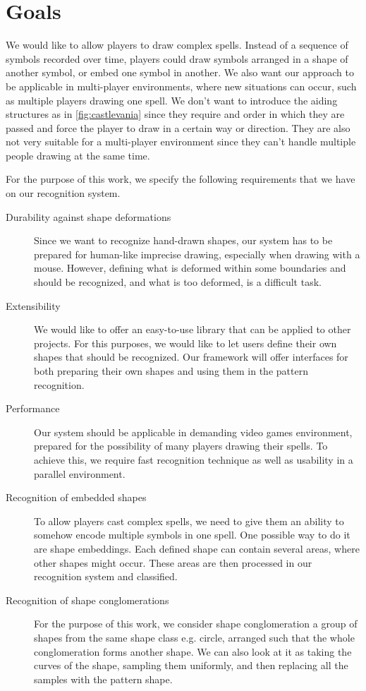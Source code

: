 \section{Goals}

We would like to allow players to draw complex spells. Instead of a sequence of symbols recorded over time, players could draw symbols arranged in a shape of another symbol, or embed one symbol in another. We also want our approach to be applicable in multi-player environments, where new situations can occur, such as multiple players drawing one spell. We don't want to introduce the aiding structures as in \cref{fig:castlevania} since they require and order in which they are passed and force the player to draw in a certain way or direction. They are also not very suitable for a multi-player environment since they can't handle multiple people drawing at the same time.

For the purpose of this work, we specify the following requirements that we have on our recognition system.
\begin{description}

\item [Durability against shape deformations]
Since we want to recognize hand-drawn shapes, our system has to be prepared for human-like imprecise drawing, especially when drawing with a mouse. However, defining what is deformed within some boundaries and should be recognized, and what is too deformed, is a difficult task.

\item [Extensibility]
We would like to offer an easy-to-use library that can be applied to other projects. For this purposes, we would like to let users define their own shapes that should be recognized. Our framework will offer interfaces for both preparing their own shapes and using them in the pattern recognition.

\item [Performance]
Our system should be applicable in demanding video games environment, prepared for the possibility of many players drawing their spells. To achieve this, we require fast recognition technique as well as usability in a parallel environment. 

\item [Recognition of embedded shapes]
To allow players cast complex spells, we need to give them an ability to somehow encode multiple symbols in one spell. One possible way to do it are shape embeddings. Each defined shape can contain several areas, where other shapes might occur. These areas are then processed in our recognition system and classified.

\item [Recognition of shape conglomerations]
For the purpose of this work, we consider shape conglomeration a group of shapes from the same shape class e.g. circle, arranged such that the whole conglomeration forms another shape. We can also look at it as taking the curves of the shape, sampling them uniformly, and then replacing all the samples with the pattern shape.

\end{description}

